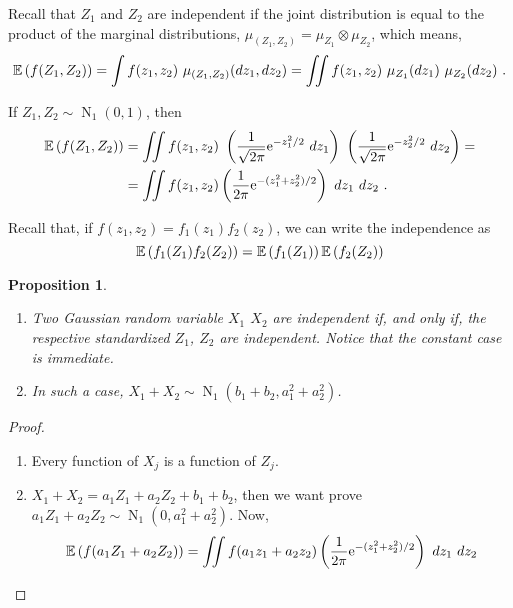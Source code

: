 \documentclass[12pt,a4paper]{amsart}
\newcommand{\gaussian}[3]{\operatorname{N}_{#1}\left(#2,#3\right)}
\theoremstyle{plain}%
\newtheorem{proposition}[thm]{Proposition}
\theoremstyle{definition}
\theoremstyle{remark}
\begin{document}
Recall that $Z_1$ and $Z_2$ are independent if the joint distribution is equal to the product of the marginal distributions, $\mu_{(Z_1,Z_2)} = \mu_{Z_1} \otimes \mu_{Z_2}$, which means,
\begin{equation*}
  \expectof{f(Z_1,Z_2)} = \int f(z_1,z_2) \ \mu_{(Z_1,Z_2)}(dz_1,dz_2) = \iint f(z_1,z_2) \ \mu_{Z_1}(dz_1) \ \mu_{Z_2}(dz_2) \ .
  \end{equation*}

  If $Z_1,Z_2 \sim \gaussian 1 0 1$, then
  \begin{align*}
    \expectof{f(Z_1,Z_2)} &= \iint f(z_1,z_2) \ \left(\frac1{\sqrt{2\pi}} \euler^{-z_1^2/2} \ dz_1\right)  \  \left(\frac1{\sqrt{2\pi}} \euler^{-z_2^2/2} \ dz_2 \right) = \\
    &= \iint f(z_1,z_2) \left(\frac1{2\pi} \euler^{-(z_1^2+z_2^2)/2}\right) \ dz_1\ dz_2 \ .
  \end{align*}

  Recall that, if $f(z_1,z_2) = f_1(z_1)f_2(z_2)$, we can write the independence as
  \begin{equation*}
    \operatorname{\mathbb E}\left(f_1(Z_1) f_2(Z_2)\right) = \operatorname{\mathbb E}\left(f_1(Z_1)\right) \operatorname{\mathbb E}\left(f_2(Z_2)\right) 
  \end{equation*}
  
  \begin{proposition} 
    \begin{enumerate}
    \item Two Gaussian random variable $X_1$ $X_2$ are independent if, and only if, the respective standardized $Z_1$, $Z_2$ are independent. Notice that the constant case is immediate.
  \item In such a case, $X_1+X_2 \sim \gaussian 1 {b_1+b_2} {a_1^2+a_2^2}$.  \end{enumerate}
  \end{proposition}

  \begin{proof}\ 
    \begin{enumerate}
    \item Every function of $X_j$ is a function of $Z_j$.
    \item $X_1+X_2 = a_1Z_1+a_2Z_2 + b_1 + b_2$, then we want prove $a_1Z_1+a_2Z_2 \sim \gaussian 1 0 {a_1^2+a_2^2}$. Now,
      \begin{equation*}
        \expectof {f(a_1Z_1+a_2Z_2)} = \iint f(a_1z_1 + a_2z_2) \left(\frac1{2\pi} \euler^{-(z_1^2+z_2^2)/2}\right) \ dz_1\ dz_2
      \end{equation*}
    \end{enumerate}
  \end{proof}
\end{document}
